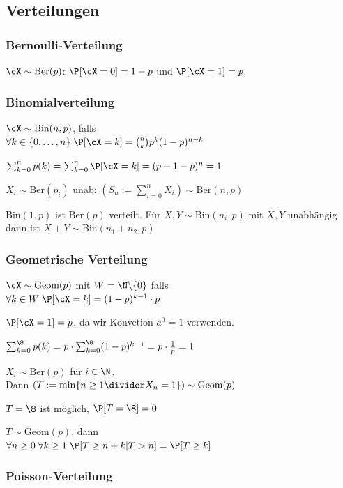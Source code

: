 \newpage
\subsection{Verteilungen}
\subsubsection{Bernoulli-Verteilung}
\shortdefinition $\cX \sim \text{Ber}(p)$: $\P[\cX = 0] = 1 - p$ und $\P[\cX = 1] = p$


\subsubsection{Binomialverteilung}
\shortdefinition $\cX \sim \text{Bin}(n, p)$, falls\\
$\forall k \in \{ 0, \ldots, n \}\; \P[\cX = k] = {n \choose k} p^k (1 - p)^{n - k}$

\shortremark $\sum_{k = 0}^{n} p(k) = \sum_{k = 0}^{n} \P[\cX = k] = (p + 1 - p)^n = 1$

\shorttheorem $X_i \sim \text{Ber}(p_i)$ unab: $(S_n := \sum_{i = 0}^{n} X_i) \sim \text{Ber}(n, p)$

\shortremark $\text{Bin}(1, p)$ ist $\text{Ber}(p)$ verteilt. Für $X, Y \sim \text{Bin}(n_i, p)$ mit $X, Y$ unabhängig dann ist $X + Y \sim \text{Bin}(n_1 + n_2, p)$


\subsubsection{Geometrische Verteilung}
\shortdefinition $\cX \sim \text{Geom}(p)$ mit $W = \N \backslash \{0\}$ falls\\
$\forall k \in W \; \P[\cX = k] = (1 - p)^{k - 1} \cdot p$

\shortremark $\P[\cX = 1] = p$, da wir Konvetion $a^0 = 1$ verwenden.

\shortremark $\sum_{k = 0}^{\8} p(k) = p \cdot \sum_{k = 0}^{\8} (1 - p)^{k - 1} = p \cdot \frac{1}{p} = 1$

\shorttheorem $X_i \sim \text{Ber}(p)$ für $i \in \N$.\\
Dann $( T := \min\{ n \geq 1 \divider X_n = 1 \} )\sim \text{Geom}(p)$

\shortremark $T = \8$ ist möglich, $\P[T = \8] = 0$

\shorttheorem $T \sim \text{Geom}(p)$, dann\\
$\forall n \geq 0 \; \forall k \geq 1 \; \P[T \geq n + k | T > n] = \P[T \geq k]$


\subsubsection{Poisson-Verteilung}
